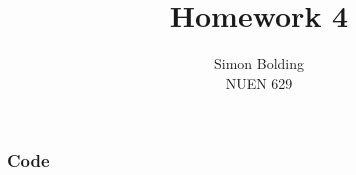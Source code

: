 \documentclass[12pt]{article}
\newenvironment{solnum}[2][Solution]{\begin{trivlist}
\item[\hskip \labelsep {\bfseries #1}\hskip \labelsep {\bfseries #2:}]\hspace{0.3in}\newline\newline}{\end{trivlist}}
\begin{document}
 
 
\title{Homework 4}%
\author{Simon Bolding\\ %
NUEN 629} %
 
\maketitle

\clearpage



\begin{solnum}{1-1}
    

\end{solnum}
\clearpage

\clearpage
\subsubsection*{Code}
%
\end{document}
